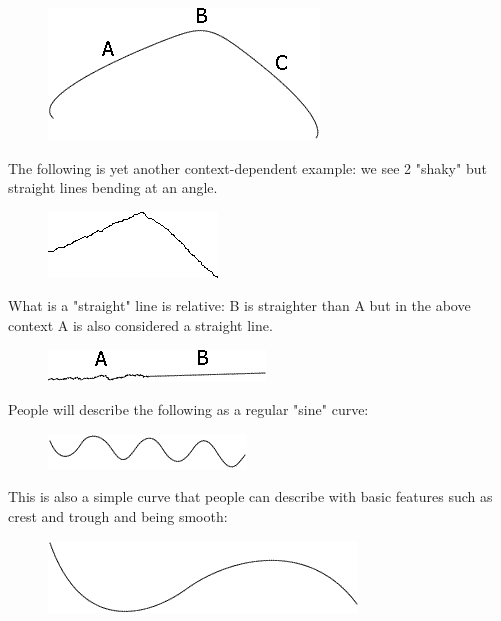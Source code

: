 \begin{figure}[H]
\centering
\includegraphics[scale=0.7, bb=0 0 272 132]{Line3.PNG}
\end{figure}

The following is yet another context-dependent example: we see 2 "shaky" but straight lines bending at an angle.

\begin{figure}[H]
\centering
\includegraphics[scale=0.7, bb=0 0 170 66]{Line4.PNG}
\end{figure}

What is a "straight" line is relative: B is straighter than A but in the above context A is also considered a straight line. 

\begin{figure}[H]
\centering
\includegraphics[scale=0.7, bb=0 0 219 32]{Line7.PNG}
\end{figure}

People will describe the following as a regular "sine" curve:

\begin{figure}[H]
\centering
\includegraphics[scale=0.7, bb=0 0 199 35]{Line5.PNG}
\end{figure}

This is also a simple curve that people can describe with basic features such as crest and trough and being smooth:

\begin{figure}[H]
\centering
\includegraphics[scale=0.7, bb=0 0 310 72]{Line6.PNG}
\end{figure}

